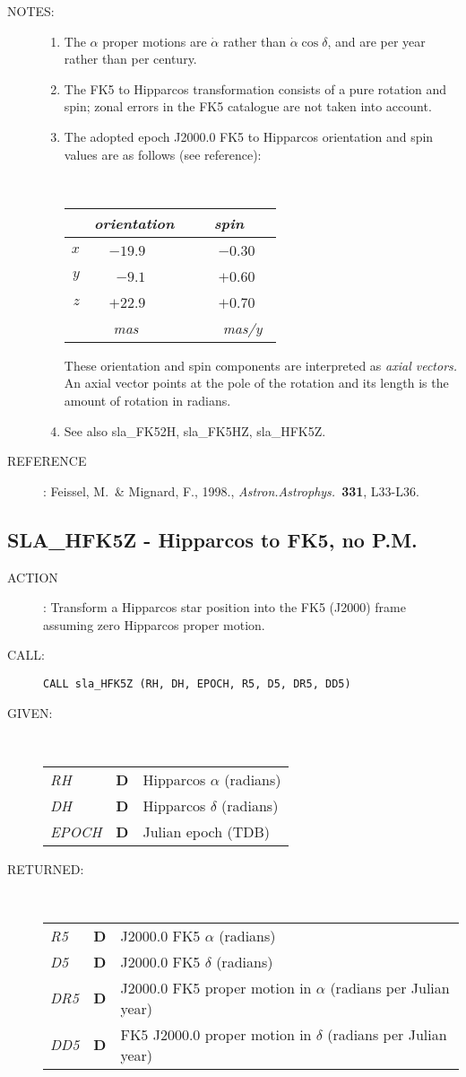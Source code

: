 \documentclass[11pt,twoside]{article}
\newcommand{\xlabel}[1]{}
\newcommand{\routine}[3]
{\hbadness=10000
  \vbox
  {
    \rule{\textwidth}{0.3mm}\\
    {\Large {\bf #1} \hfill #2 \hfill {\bf #1}}\\
    \setlength{\oldspacing}{\topsep}
    \setlength{\topsep}{0.3ex}
    \begin{description}
      #3
    \end{description}
    \setlength{\topsep}{\oldspacing}
  }
}
\renewcommand{\routine}[3]
   {
      \subsection{#1\xlabel{#1} - #2\label{#1}}
       \begin{description}
         #3
       \end{description}
   }
\newcommand{\action}[1]
{\item[ACTION]: #1}
\newcommand{\action}[1]
   {\item[ACTION:] #1}
\newcommand{\call}[1]
{\item[CALL]: \hspace{0.4em}{\tt #1}}
\newlength{\oldspacing}
\renewcommand{\call}[1]
   {
    \item[CALL:] {\tt #1}
   }
\newcommand{\args}[2]
{
  \goodbreak
  \setlength{\oldspacing}{\topsep}
  \setlength{\topsep}{0.3ex}
  \begin{description}
  \item[#1]:\\[1.5ex]
    \begin{tabular}{p{7em}p{6em}p{22em}}
      #2
    \end{tabular}
  \end{description}
  \setlength{\topsep}{\oldspacing}
}
\renewcommand{\args}[2]
   {
     \begin{description}
        \item[#1:]\\
        \begin{tabular}{p{7em}p{6em}l}
           #2
        \end{tabular}
     \end{description}
   }
\newcommand{\spec}[3]
{
  {\em {#1}} & {\bf \mbox{#2}} & {#3}
}
\newcommand{\notes}[1]
{
  \goodbreak
  \setlength{\oldspacing}{\topsep}
  \setlength{\topsep}{0.3ex}
  \begin{description}
    \item[NOTES]:
        #1
  \end{description}
  \setlength{\topsep}{\oldspacing}
}
\renewcommand{\notes}[1]
   {
      \begin{description}
         \item[NOTES:]
            #1
      \end{description}
   }
\newcommand{\aref}[1]
{
  \goodbreak
  \setlength{\oldspacing}{\topsep}
  \setlength{\topsep}{0.3ex}
  \begin{description}
    \item[REFERENCE]:
        #1
  \end{description}
  \setlength{\topsep}{\oldspacing}
}
\newcommand{\aref}[1]
   {
     \begin{description}
       \item[REFERENCE:]
           #1
     \end{description}
   }
\begin{document}
\notes
{
 \begin{enumerate}
  \item The $\alpha$ proper motions are $\dot{\alpha}$ rather than
        $\dot{\alpha}\cos\delta$, and are per year rather than per century.
  \item The FK5 to Hipparcos
        transformation consists of a pure rotation and spin;
        zonal errors in the FK5 catalogue are not taken into account.
  \item The adopted epoch J2000.0 FK5 to Hipparcos orientation and spin
        values are as follows (see reference):

        \vspace{2ex}

        ~~~~~~~~~~~~
        \begin{tabular}{|r|r|r|} \hline
        &
        \multicolumn{1}{|c}{\it orientation} &
        \multicolumn{1}{|c|}{\it ~~~spin~~~} \\ \hline
        $x$ & $-19.9$~~~~ & ~$-0.30$~~ \\
        $y$ &  $-9.1$~~~~ & ~$+0.60$~~ \\
        $z$ & $+22.9$~~~~ & ~$+0.70$~~ \\ \hline
        & {\it mas}~~~~~ & ~{\it mas/y}~ \\ \hline
        \end{tabular}

        \vspace{3ex}

        These orientation and spin components are interpreted as
        {\it axial vectors.}  An axial vector points at the pole of
        the rotation and its length is the amount of rotation in radians.
  \item See also sla\_FK52H, sla\_FK5HZ, sla\_HFK5Z.
 \end{enumerate}
}
\aref {Feissel, M.\ \& Mignard, F., 1998.,  {\it Astron.Astrophys.}\
       {\bf 331}, L33-L36.}
\routine{SLA\_HFK5Z}{Hipparcos to FK5, no P.M.}
{
 \action{Transform a Hipparcos star position
         into the FK5 (J2000) frame assuming zero Hipparcos proper motion.}
 \call{CALL sla\_HFK5Z (RH, DH, EPOCH, R5, D5, DR5, DD5)}
}
\args{GIVEN}
{
 \spec{RH}{D}{Hipparcos $\alpha$ (radians)} \\
 \spec{DH}{D}{Hipparcos $\delta$ (radians)} \\
 \spec{EPOCH}{D}{Julian epoch (TDB)}
}
\args{RETURNED}
{
 \spec{R5}{D}{J2000.0 FK5 $\alpha$ (radians)} \\
 \spec{D5}{D}{J2000.0 FK5 $\delta$ (radians)} \\
 \spec{DR5}{D}{J2000.0 FK5 proper motion in $\alpha$
                              (radians per Julian year)} \\
 \spec{DD5}{D}{FK5 J2000.0 proper motion in $\delta$
                              (radians per Julian year)}
}
\end{document}
